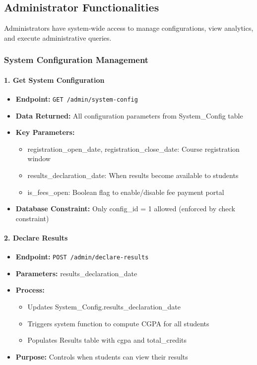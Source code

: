 \documentclass[12pt]{article}
\begin{document}
\subsection{Administrator Functionalities}

Administrators have system-wide access to manage configurations, view analytics, and execute administrative queries.

\subsubsection{System Configuration Management}

\paragraph{1. Get System Configuration}
\begin{itemize}
    \item \textbf{Endpoint:} \texttt{GET /admin/system-config}
    \item \textbf{Data Returned:} All configuration parameters from System\_Config table
    \item \textbf{Key Parameters:}
        \begin{itemize}
            \item registration\_open\_date, registration\_close\_date: Course registration window
            \item results\_declaration\_date: When results become available to students
            \item is\_fees\_open: Boolean flag to enable/disable fee payment portal
        \end{itemize}
    \item \textbf{Database Constraint:} Only config\_id = 1 allowed (enforced by check constraint)
\end{itemize}

\paragraph{2. Declare Results}
\begin{itemize}
    \item \textbf{Endpoint:} \texttt{POST /admin/declare-results}
    \item \textbf{Parameters:} results\_declaration\_date
    \item \textbf{Process:}
        \begin{itemize}
            \item Updates System\_Config.results\_declaration\_date
            \item Triggers system function to compute CGPA for all students
            \item Populates Results table with cgpa and total\_credits
        \end{itemize}
    \item \textbf{Purpose:} Controls when students can view their results
\end{itemize}
\end{document}
